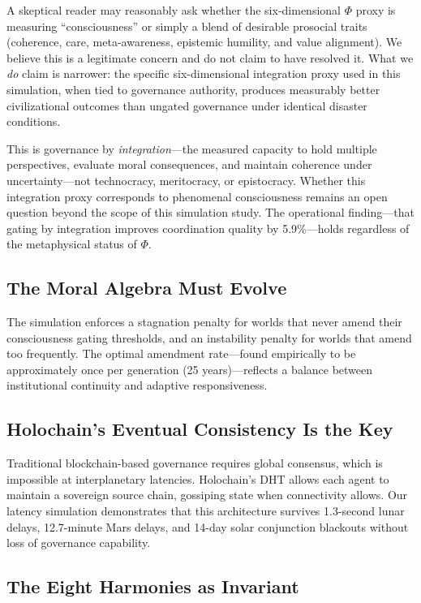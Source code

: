 \documentclass[12pt,a4paper]{article}
\begin{document}
A skeptical reader may reasonably ask whether the six-dimensional $\Phi$ proxy is measuring ``consciousness'' or simply a blend of desirable prosocial traits (coherence, care, meta-awareness, epistemic humility, and value alignment). We believe this is a legitimate concern and do not claim to have resolved it. What we \emph{do} claim is narrower: the specific six-dimensional integration proxy used in this simulation, when tied to governance authority, produces measurably better civilizational outcomes than ungated governance under identical disaster conditions.

This is governance by \emph{integration}---the measured capacity to hold multiple perspectives, evaluate moral consequences, and maintain coherence under uncertainty---not technocracy, meritocracy, or epistocracy. Whether this integration proxy corresponds to phenomenal consciousness remains an open question beyond the scope of this simulation study. The operational finding---that gating by integration improves coordination quality by 5.9\%---holds regardless of the metaphysical status of $\Phi$.

\subsection{The Moral Algebra Must Evolve}

The simulation enforces a stagnation penalty for worlds that never amend their consciousness gating thresholds, and an instability penalty for worlds that amend too frequently. The optimal amendment rate---found empirically to be approximately once per generation (25 years)---reflects a balance between institutional continuity and adaptive responsiveness.

\subsection{Holochain's Eventual Consistency Is the Key}

Traditional blockchain-based governance requires global consensus, which is impossible at interplanetary latencies. Holochain's DHT allows each agent to maintain a sovereign source chain, gossiping state when connectivity allows. Our latency simulation demonstrates that this architecture survives 1.3-second lunar delays, 12.7-minute Mars delays, and 14-day solar conjunction blackouts without loss of governance capability.

\subsection{The Eight Harmonies as Invariant}
\end{document}
